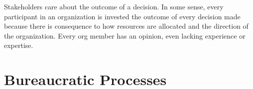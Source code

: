 \documentclass{book}
\begin{document}
    Stakeholders care about the outcome of a decision. 
    In some sense, every participant in an organization is invested the outcome of every decision made because there is consequence to how resources are allocated and the direction of the organization. Every org member has an opinion, even lacking experience or expertise. 
    
    
    
%    
    
%    
%    
  \chapter{Bureaucratic Processes\label{sec:process}}
    
    
    
    
    
    
    
    
    
    
    
  \clearpage

\clearpage





\appendix
\end{document}
